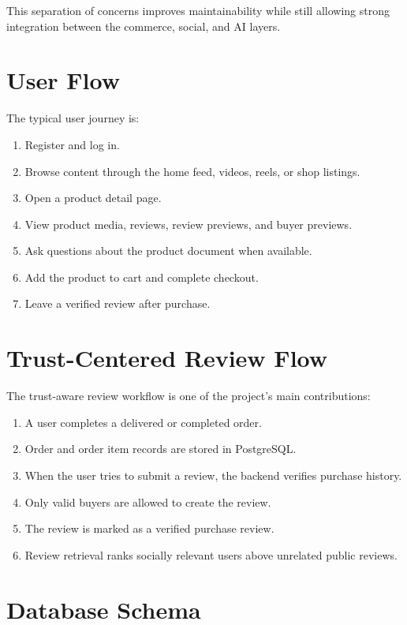 \documentclass[12pt,letterpaper]{report}
\begin{document}
This separation of concerns improves maintainability while still allowing strong integration between the commerce, social, and AI layers.

\section{User Flow}

The typical user journey is:

\begin{enumerate}
  \item Register and log in.
  \item Browse content through the home feed, videos, reels, or shop listings.
  \item Open a product detail page.
  \item View product media, reviews, review previews, and buyer previews.
  \item Ask questions about the product document when available.
  \item Add the product to cart and complete checkout.
  \item Leave a verified review after purchase.
\end{enumerate}

\section{Trust-Centered Review Flow}

The trust-aware review workflow is one of the project's main contributions:

\begin{enumerate}
  \item A user completes a delivered or completed order.
  \item Order and order item records are stored in PostgreSQL.
  \item When the user tries to submit a review, the backend verifies purchase history.
  \item Only valid buyers are allowed to create the review.
  \item The review is marked as a verified purchase review.
  \item Review retrieval ranks socially relevant users above unrelated public reviews.
\end{enumerate}

\section{Database Schema}
\end{document}
